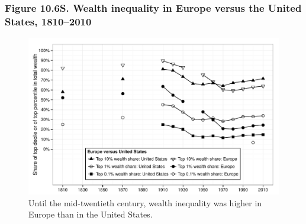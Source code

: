 \documentclass[t]{beamer}\usepackage[]{graphicx}\usepackage[]{color}
\newenvironment{knitrout}{}{} %
\begin{document}
\begin{frame}[label=Figure_10_6S]
\frametitle{Figure 10.6S. Wealth inequality in Europe versus the United States, 1810--2010}
\begin{figure}[t]
\begin{minipage}[b]{\textwidth}
\centering
\begin{knitrout}\footnotesize
{}\color{fgcolor}

{\centering \includegraphics[width=1\linewidth]{figures/bw/Figure_10_6S} 

}



\end{knitrout}
\caption{Until the mid-twentieth century, wealth inequality was higher in Europe than in the United States.}
\end{minipage}
\end{figure}
\end{frame}
\end{document}
